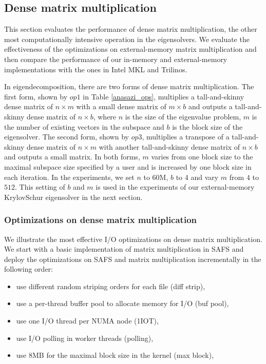 \subsection{Dense matrix multiplication}

This section evaluates the performance of dense matrix multiplication, the other
most computationally intensive operation in the eigensolvers. We evaluate
the effectiveness of the optimizations on external-memory matrix multiplication
and then compare the performance of our in-memory and external-memory
implementations with the ones in Intel MKL and Trilinos.

In eigendecomposition, there are two forms of dense matrix multiplication.
The first form, shown by $op1$ in Table \ref{anasazi_ops}, multiplies
a tall-and-skinny dense matrix of $n \times m$
with a small dense matrix of $m \times b$ and outputs a tall-and-skinny dense
matrix of $n \times b$, where $n$ is the size of the eigenvalue problem,
$m$ is the number of existing vectors in the subspace and $b$ is the block
size of the eigensolver. The second form, shown by $op3$, multiplies
a transpose of a tall-and-skinny dense matrix of $n \times m$ with another
tall-and-skinny dense matrix of $n \times b$ and outputs a small matrix.
In both forms, $m$ varies from one block size to the maximal subspace size
specified by a user and is increased by one block size in each
iteration. In the experiments, we set $n$ to 60M, $b$ to 4 and vary $m$
from $4$ to $512$. This setting of $b$ and $m$ is used in the experiments
of our external-memory KrylovSchur eigensolver in the next section.

\subsubsection{Optimizations on dense matrix multiplication}

We illustrate the most effective I/O optimizations on dense matrix
multiplication. We start with a basic implementation of matrix multiplication
in SAFS and deploy the optimizations on SAFS and matrix multiplication
incrementally in the following order:
\begin{itemize} \itemsep1pt \parskip0pt 
	\item use different random striping orders for each file (diff strip),
	\item use a per-thread buffer pool to allocate memory for I/O (buf pool),
	\item use one I/O thread per NUMA node (1IOT),
	\item use I/O polling in worker threads (polling),
	\item use 8MB for the maximal block size in the kernel (max block),
\end{itemize}

